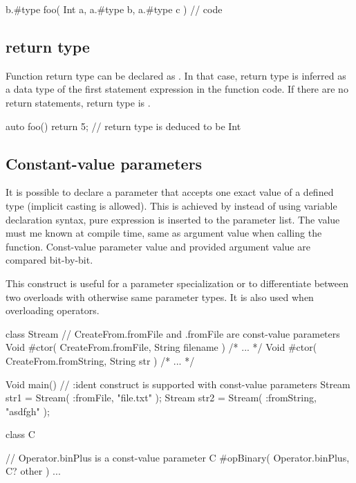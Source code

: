 \begin{code}
b.#type foo( Int a, a.#type b, a.#type c ) {
	// code
}
\end{code}

\subsection{ return type}
Function return type can be declared as . In that case, return type is inferred as a data type of the first  statement expression in the function code. If there are no return statements, return type is .

\begin{code}
auto foo() {
	return 5; // return type is deduced to be Int
}
\end{code}

\subsection{Constant-value parameters}
It is possible to declare a parameter that accepts one exact value of a defined type (implicit casting is allowed). This is achieved by instead of using variable declaration syntax, pure expression is inserted to the parameter list. The value must me known at compile time, same as argument value when calling the function. Const-value parameter value and provided argument value are compared bit-by-bit. 

This construct is useful for a \ctime parameter specialization or to differentiate between two overloads with otherwise same parameter types. It is also used when overloading operators.

\begin{code}
class Stream {
	// CreateFrom.fromFile and .fromFile are const-value parameters
	Void #ctor( CreateFrom.fromFile, String filename ) { /* ... */ }
	Void #ctor( CreateFrom.fromString, String str ) { /* ... */ } 
}

Void main() {
	// :ident construct is supported with const-value parameters
	Stream str1 = Stream( :fromFile, "file.txt" );
	Stream str2 = Stream( :fromString, "asdfgh" );
}
\end{code}

\begin{code}
class C {
	
	// Operator.binPlus is a const-value parameter
	C #opBinary( Operator.binPlus, C? other ) {
		...	
	}
	
}
\end{code}


